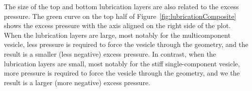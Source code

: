 \documentclass[twoside,twocolumn,9pt]{article}
\newcommand{\subfigimg}[3][,]{%
  \setbox1=\hbox{\texttt{[image: \#3]}}%
  \leavevmode\rlap{\usebox1}%
  \rlap{\hspace*{0pt}\raisebox{\dimexpr\ht1-0\baselineskip}{\bf
  \normalsize #2}}%
  \phantom{\usebox1}%
}
\begin{document}

The size of the top and bottom lubrication layers are also related to
the excess pressure. The green curve on the top half of
Figure~\ref{fig:lubricationComposite} shows the excess pressure with the
axis aligned on the right side of the plot. When the lubrication layers
are large, most notably for the multicomponent vesicle, less pressure is
required to force the vesicle through the geometry, and the result is a
smaller (less negative) excess pressure. In contrast, when the
lubrication layers are small, most notably for the stiff
single-component vesicle, more pressure is required to force the vesicle
through the geometry, and we the result is a larger (more negative)
excess pressure.
\end{document}
